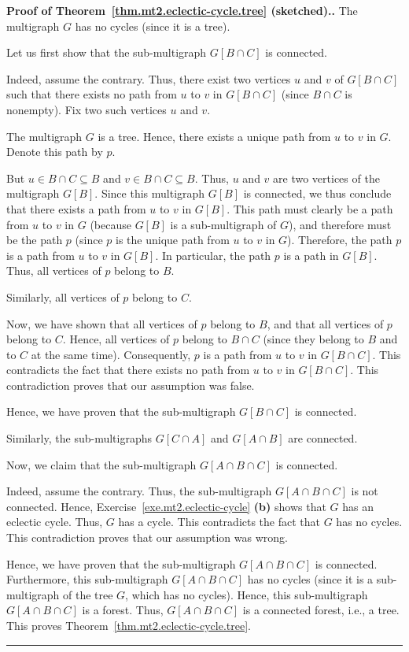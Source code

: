 \documentclass[numbers=enddot,12pt,final,onecolumn,notitlepage]{scrartcl}%
\theoremstyle{definition}
\newenvironment{proof}[1][Proof]{\noindent\textbf{#1.} }{\ \rule{0.5em}{0.5em}}
\newcommand{\ive}[1]{\left[ #1 \right]}
\begin{document}
\begin{proof}[Proof of Theorem~\ref{thm.mt2.eclectic-cycle.tree}
(sketched).]
The multigraph $G$ has no cycles (since it is a tree).

Let us first show that the sub-multigraph $G \ive{B \cap C}$ is connected.

Indeed, assume the contrary.
Thus, there exist two vertices $u$ and $v$ of $G \ive{B \cap C}$ such
that there exists no path from $u$ to $v$ in $G \ive{B \cap C}$
(since $B \cap C$ is nonempty).
Fix two such vertices $u$ and $v$.

The multigraph $G$ is a tree.
Hence, there exists a unique path from $u$ to $v$ in $G$.
Denote this path by $p$.

But $u \in B \cap C \subseteq B$ and $v \in B \cap C \subseteq B$.
Thus, $u$ and $v$ are two vertices of the multigraph $G \ive{B}$.
Since this multigraph $G \ive{B}$ is connected, we thus conclude that
there exists a path from $u$ to $v$ in $G \ive{B}$.
This path must clearly be a path from $u$ to $v$ in $G$
(because $G \ive{B}$ is a sub-multigraph of $G$),
and therefore must be the path $p$
(since $p$ is the unique path from $u$ to $v$ in $G$).
Therefore, the path $p$ is a path from $u$ to $v$ in $G \ive{B}$.
In particular, the path $p$ is a path in $G \ive{B}$.
Thus, all vertices of $p$ belong to $B$.

Similarly, all vertices of $p$ belong to $C$.

Now, we have shown that all vertices of $p$ belong to $B$, and that
all vertices of $p$ belong to $C$.
Hence, all vertices of $p$ belong to $B \cap C$ (since they belong to
$B$ and to $C$ at the same time).
Consequently, $p$ is a path from $u$ to $v$ in $G \ive{B \cap C}$.
This contradicts the fact that there exists no path from $u$ to $v$
in $G \ive{B \cap C}$.
This contradiction proves that our assumption was false.

Hence, we have proven that the sub-multigraph $G \ive{B \cap C}$ is
connected.

Similarly, the sub-multigraphs $G \ive{C \cap A}$ and $G \ive{A \cap B}$
are connected.

Now, we claim that
the sub-multigraph $G \ive{A \cap B \cap C}$ is connected.

Indeed, assume the contrary.
Thus, the sub-multigraph $G \ive{A \cap B \cap C}$ is not connected.
Hence, Exercise~\ref{exe.mt2.eclectic-cycle} \textbf{(b)} shows that
$G$ has an eclectic cycle.
Thus, $G$ has a cycle.
This contradicts the fact that $G$ has no cycles.
This contradiction proves that our assumption was wrong.

Hence, we have proven that the sub-multigraph
$G \ive{A \cap B \cap C}$ is connected.
Furthermore, this sub-multigraph $G \ive{A \cap B \cap C}$ has no cycles
(since it is a sub-multigraph of the tree $G$, which has no cycles).
Hence, this sub-multigraph $G \ive{A \cap B \cap C}$ is a forest.
Thus, $G \ive{A \cap B \cap C}$ is a connected forest, i.e., a tree.
This proves Theorem~\ref{thm.mt2.eclectic-cycle.tree}.
\end{proof}
\end{document}
